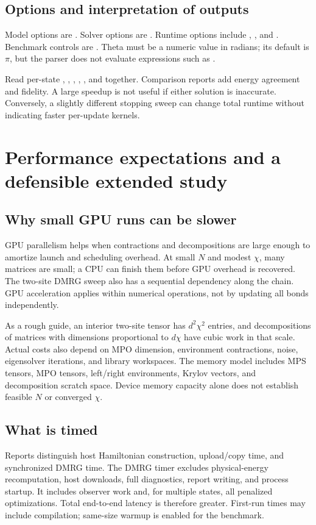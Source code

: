 \subsection{Options and interpretation of outputs}
Model options are . Solver options are . Runtime options include , , and . Benchmark controls are . Theta must be a numeric value in radians; its default is $\pi$, but the parser does not evaluate expressions such as .

Read per-state , , , , , and  together. Comparison reports add energy agreement and fidelity. A large speedup is not useful if either solution is inaccurate. Conversely, a slightly different stopping sweep can change total runtime without indicating faster per-update kernels.

\section{Performance expectations and a defensible extended study}
\subsection{Why small GPU runs can be slower}
GPU parallelism helps when contractions and decompositions are large enough to amortize launch and scheduling overhead. At small $N$ and modest $\chi$, many matrices are small; a CPU can finish them before GPU overhead is recovered. The two-site DMRG sweep also has a sequential dependency along the chain. GPU acceleration applies within numerical operations, not by updating all bonds independently.

As a rough guide, an interior two-site tensor has $d^2\chi^2$ entries, and decompositions of matrices with dimensions proportional to $d\chi$ have cubic work in that scale. Actual costs also depend on MPO dimension, environment contractions, noise, eigensolver iterations, and library workspaces. The memory model includes MPS tensors, MPO tensors, left/right environments, Krylov vectors, and decomposition scratch space. Device memory capacity alone does not establish feasible $N$ or converged $\chi$.

\subsection{What is timed}
Reports distinguish host Hamiltonian construction, upload/copy time, and synchronized DMRG time. The DMRG timer excludes physical-energy recomputation, host downloads, full diagnostics, report writing, and process startup. It includes observer work and, for multiple states, all penalized optimizations. Total end-to-end latency is therefore greater. First-run times may include compilation; same-size warmup is enabled for the benchmark.

